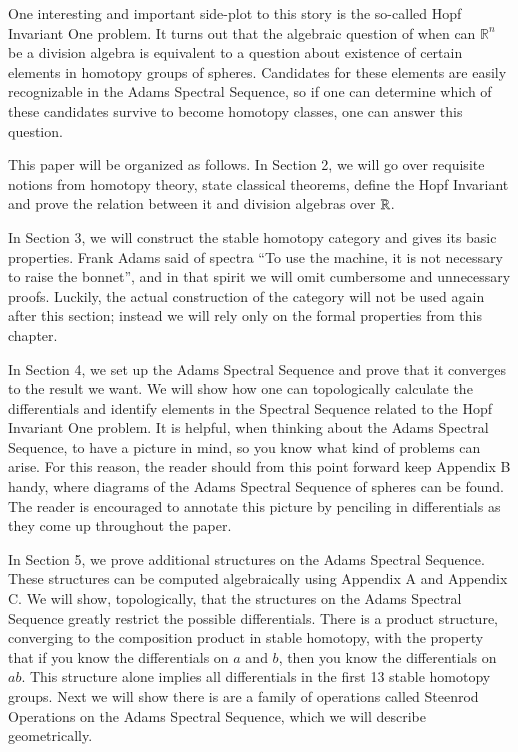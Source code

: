 One interesting and important side-plot to this story is the so-called Hopf Invariant One problem.  
It turns out that the algebraic question of when can $\mathbb{R}^n$ be a division algebra is equivalent to a question about existence of certain elements in homotopy groups of spheres.
Candidates for these elements are easily recognizable in the Adams Spectral Sequence, so if one can determine which of these candidates survive to become homotopy classes, one can answer this question.  

This paper will be organized as follows.
In Section 2, we will go over requisite notions from homotopy theory, state classical theorems, define the Hopf Invariant and prove the relation between it and division algebras over $\mathbb{R}$.


In Section 3, we will construct the stable homotopy category and gives its basic properties.  
Frank Adams said of spectra ``To use the machine, it is not necessary to raise the bonnet'', and in that spirit we will omit cumbersome and unnecessary proofs. 
Luckily, the actual construction of the category will not be used again after this section; instead we will rely only on the formal properties from this chapter.  

In Section 4, we set up the Adams Spectral Sequence and prove that it converges to the result we want.
We will show how one can topologically calculate the differentials and identify elements in the Spectral Sequence related to the Hopf Invariant One problem.
It is helpful, when thinking about the Adams Spectral Sequence, to have a picture in mind, so you know what kind of problems can arise.
For this reason, the reader should from this point forward keep Appendix B handy, where diagrams of the Adams Spectral Sequence of spheres can be found.
The reader is encouraged to annotate this picture by penciling in differentials as they come up throughout the paper.

In Section 5, we prove additional structures on the Adams Spectral Sequence.
These structures can be computed algebraically using Appendix A and Appendix C.
We will show, topologically, that the structures on the Adams Spectral Sequence greatly restrict the possible differentials.  
There is a product structure, converging to the composition product in stable homotopy, with the property that if you know the differentials on $a$ and $b$, then you know the differentials on $ab$.  
This structure alone implies all differentials in the first 13 stable homotopy groups.
Next we will show there is are a family of operations called Steenrod Operations on the Adams Spectral Sequence, which we will describe geometrically.

